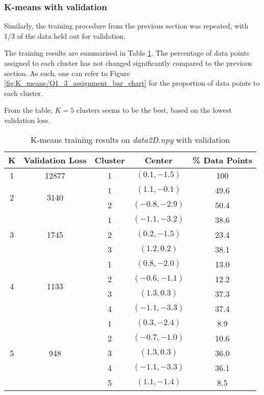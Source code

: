 \documentclass[a4paper,12pt]{article}
\begin{document}
\clearpage
\subsubsection{K-means with validation}
Similarly, the training procedure from the previous section was repeated, with 1/3 of the data held out for validation.

The training results are summarised in Table \ref{tab:K_means/2D_1_1_4_results}. The percentage of data points assigned to each cluster has not changed significantly compared to the previous section. As such, one can refer to Figure \ref{fig:K_means/Q1_3_assignment_bar_chart} for the proportion of data points to each cluster.

From the table, $K = 5$ clusters seems to be the best, based on the lowest validation loss.

\begin{table}[!htb]
\centering
\caption{K-means training results on \textit{data2D.npy} with validation}
\label{tab:K_means/2D_1_1_4_results}
\vspace{1em}
\begin{tabular}{|c|c|c|c|c|} \hline
K & Validation Loss & Cluster & Center & \% Data Points \\ \hline
1 & 12877 & 1 & $(0.1, -1.5)$ & 100 \\ \hline
\multirow{2}{*}{2} & \multirow{2}{*}{3140} 
	& 1 & $(1.1, -0.1)$ & 49.6 \\
    & & 2 & $(-0.8, -2.9)$ & 50.4 \\ \hline
\multirow{3}{*}{3} & \multirow{3}{*}{1745} 
	& 1 & $(-1.1, -3.2)$ & 38.6 \\ 
    & & 2 & $(0.2, -1.5)$ & 23.4 \\ 
    & & 3 & $(1.2, 0.2)$ & 38.1 \\ \hline
\multirow{4}{*}{4} & \multirow{4}{*}{1133} 
	& 1 & $(0.8, -2.0)$ & 13.0 \\ 
    & & 2 & $(-0.6, -1.1)$ & 12.2 \\ 
    & & 3 & $(1.3, 0.3)$ & 37.3 \\
    & & 4 & $(-1.1, -3.3)$ & 37.4 \\ \hline
\multirow{5}{*}{5} & \multirow{5}{*}{948} 
	& 1 & $(0.3, -2.4)$ & 8.9 \\ 
    & & 2 & $(-0.7, -1.0)$ & 10.6 \\ 
    & & 3 & $(1.3, 0.3)$ & 36.0 \\
    & & 4 & $(-1.1, -3.3)$ & 36.1 \\
    & & 5 & $(1.1, -1.4)$ & 8.5 \\ \hline
\end{tabular}
\end{table}
\end{document}
